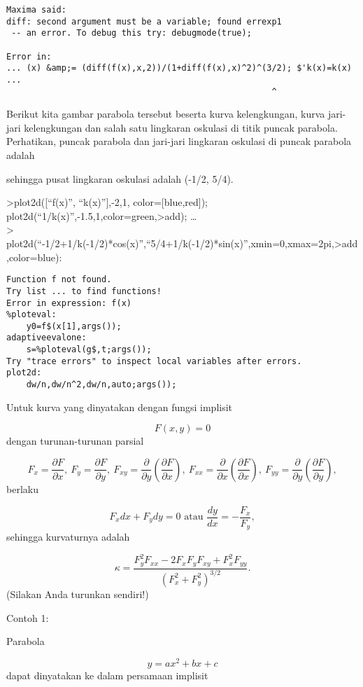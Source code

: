 \documentclass[
]{book}
\begin{document}
\begin{verbatim}
Maxima said:
diff: second argument must be a variable; found errexp1
 -- an error. To debug this try: debugmode(true);

Error in:
... (x) &amp;= (diff(f(x),x,2))/(1+diff(f(x),x)^2)^(3/2); $'k(x)=k(x)  ...
                                                     ^
\end{verbatim}

Berikut kita gambar parabola tersebut beserta kurva kelengkungan, kurva jari-jari kelengkungan dan salah satu lingkaran oskulasi di titik puncak parabola. Perhatikan, puncak parabola dan jari-jari lingkaran oskulasi di puncak parabola adalah

sehingga pusat lingkaran oskulasi adalah (-1/2, 5/4).

\textgreater plot2d({[}``f(x)'', ``k(x)''{]},-2,1, color={[}blue,red{]}); plot2d(``1/k(x)'',-1.5,1,color=green,\textgreater add); \ldots{}\\
\textgreater{} plot2d(``-1/2+1/k(-1/2)*cos(x)'',``5/4+1/k(-1/2)*sin(x)'',xmin=0,xmax=2pi,\textgreater add,color=blue):

\begin{verbatim}
Function f not found.
Try list ... to find functions!
Error in expression: f(x)
%ploteval:
    y0=f$(x[1],args());
adaptiveevalone:
    s=%ploteval(g$,t;args());
Try "trace errors" to inspect local variables after errors.
plot2d:
    dw/n,dw/n^2,dw/n,auto;args());
\end{verbatim}

Untuk kurva yang dinyatakan dengan fungsi implisit

\[F(x,y)=0\]dengan turunan-turunan parsial

\[F_x=\frac{\partial F}{\partial x},\ F_y=\frac{\partial F}{\partial y},\ F_{xy}=\frac{\partial}{\partial y}\left(\frac{\partial F}{\partial x}\right),\ F_{xx}=\frac{\partial}{\partial x}\left(\frac{\partial F}{\partial x}\right),\ F_{yy}=\frac{\partial}{\partial y}\left(\frac{\partial F}{\partial y}\right),\]berlaku

\[F_x dx+ F_y dy = 0\text{ atau } \frac{dy}{dx}=-\frac{F_x}{F_y},\]sehingga kurvaturnya adalah

\[\kappa =\frac {F_y^2F_{xx}-2F_xF_yF_{xy}+F_x^2F_{yy}}{\left(F_x^2+F_y^2\right)^{3/2}}.\](Silakan Anda turunkan sendiri!)

Contoh 1:

Parabola

\[y=ax^2+bx+c\]dapat dinyatakan ke dalam persamaan implisit
\end{document}
